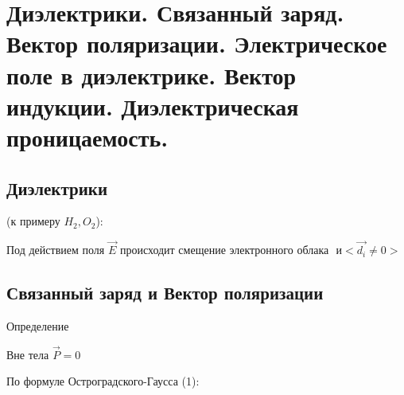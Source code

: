 \section{Диэлектрики. Связанный заряд. Вектор поляризации. Электрическое поле
в диэлектрике. Вектор индукции. Диэлектрическая проницаемость.}

\subsection*{Диэлектрики}

(к примеру $H_2,O_2$):



Под действием поля $\vec{E}$ происходит смещение электронного облака
 $\text{ и}<\vec{d_i}\neq0>$




\newpage




\subsection*{Связанный заряд и Вектор поляризации}




Определение


Вне тела $\vec{P}=0$

\newpage


По формуле Остроградского-Гаусса (1):



